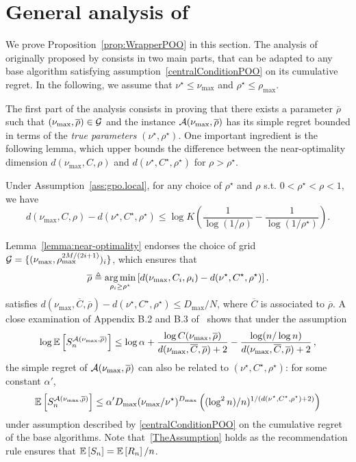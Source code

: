\section{General analysis of \POO}\label{app:gpo.poo}

We prove Proposition~\ref{prop:WrapperPOO} in this section. The analysis of \POO originally proposed by \cite{grill2015poo} consists in two main parts, that can be adapted to any base algorithm satisfying assumption~\eqref{centralConditionPOO} on its cumulative regret. In the following, we assume that $\nu^\star \leq \nu_{\max}$ and $\rho^\star \leq \rho_{\max}$. 

The first part of the analysis consists in proving that there exists a parameter $\overline{\rho}$ such that $(\nu_{\max},\overline{\rho}) \in \mathcal{G}$ and the instance $\mathcal{A}(\nu_{\max},\overline{\rho})$ has its simple regret bounded in terms of the \emph{true parameters} $(\nu^\star,\rho^\star)$.  One important ingredient is the following lemma, which upper bounds the difference between the near-optimality dimension $d(\nu_{\max},C,\rho)$ and $d(\nu^\star,C^\star,\rho^\star)$ for $\rho > \rho^\star$. 
\begin{lemma}\label{lemma:near-optimality}
	Under Assumption~\ref{ass:gpo.local}, for any choice of $\rho^\star$ and $\rho$ s.t. $0<\rho^\star<\rho<1$, we have
	\[
		d(\nu_{\max},C,\rho) - d(\nu^\star,C^\star,\rho^\star) \leq \log K \left(\frac{1}{\log(1/\rho)} - \frac{1}{\log(1/\rho^\star)}\right)\!.	
	\]	
\end{lemma}
Lemma~\ref{lemma:near-optimality} endorses the choice of grid $\mathcal{G} = \{(\nu_{\max},\rho_{\max}^{2M/(2i+1)})_i\}$, which ensures that 
\[
	\overline{\rho} \triangleq \underset{\rho_i\geq\rho^\star}{\operatorname*{arg\,min}} \left[d(\nu_{\max},C_i,\rho_i) - d(\nu^\star,C^\star,\rho^\star)\right].
\]
satisfies $d(\nu_{\max},\overline{C},\overline{\rho}) - d(\nu^\star,C^\star,\rho^\star) \leq D_{\max}/N$, where $\overline{C}$ is associated to $\overline{\rho}$. A close examination of Appendix B.2 and B.3 of~\cite{grill2015poo} shows that under the assumption  
\begin{equation}\label{TheAssumption}
    \log \mathbb{E}\left[S_n^{\mathcal{A}(\nu_{\max},\overline{\rho})}\right] \leq \log\alpha + \frac{\log C(\nu_{\max},\overline{\rho})}{d(\nu_{\max},\overline{C},\overline{\rho})+2} - \frac{\log(n/\log n)}{d(\nu_{\max},\overline{C},\overline{\rho})+2}\,,
\end{equation}
the simple regret of $\mathcal{A}(\nu_{\max},\overline{\rho})$ can also be related to $(\nu^\star,C^\star,\rho^\star)$: for some constant $\alpha'$, 
\begin{equation}\label{THEBound}
    \mathbb{E}\left[S_n^{\mathcal{A}(\nu_{\max},\overline{\rho})}\right] \leq \alpha' D_{\max}(\nu_{\max}/\nu^\star)^{D_{\max}} \left( (\log^2 n)/n)^{1/(d(\nu^\star,C^\star,\rho^\star)+2)} \right)
\end{equation}
under assumption described by \eqref{centralConditionPOO} on the cumulative regret of the base algorithms. Note that~\eqref{TheAssumption} holds as the recommendation rule ensures that $\mathbb{E}\left[S_n\right]=\mathbb{E}\left[R_n\right]/n$.  

